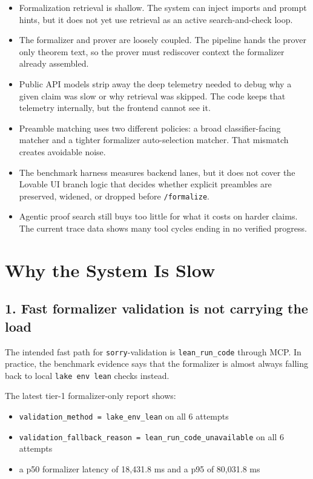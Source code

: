 \documentclass[11pt]{article}
\begin{document}
\begin{itemize}[leftmargin=1.5em]
  \item Formalization retrieval is shallow. The system can inject imports and
  prompt hints, but it does not yet use retrieval as an active search-and-check
  loop.
  \item The formalizer and prover are loosely coupled. The pipeline hands the
  prover only theorem text, so the prover must rediscover context the
  formalizer already assembled.
  \item Public API models strip away the deep telemetry needed to debug why a
  given claim was slow or why retrieval was skipped. The code keeps that
  telemetry internally, but the frontend cannot see it.
  \item Preamble matching uses two different policies: a broad classifier-facing
  matcher and a tighter formalizer auto-selection matcher. That mismatch creates
  avoidable noise.
  \item The benchmark harness measures backend lanes, but it does not cover the
  Lovable UI branch logic that decides whether explicit preambles are preserved,
  widened, or dropped before \texttt{/formalize}.
  \item Agentic proof search still buys too little for what it costs on harder
  claims. The current trace data shows many tool cycles ending in no verified
  progress.
\end{itemize}

\section{Why the System Is Slow}

\subsection*{1. Fast formalizer validation is not carrying the load}

The intended fast path for \texttt{sorry}-validation is
\texttt{lean\_run\_code} through MCP. In practice, the benchmark evidence says
that the formalizer is almost always falling back to local
\texttt{lake env lean} checks instead.

The latest tier-1 formalizer-only report shows:

\begin{itemize}[leftmargin=1.5em]
  \item \texttt{validation\_method = lake\_env\_lean} on all 6 attempts
  \item \texttt{validation\_fallback\_reason = lean\_run\_code\_unavailable} on all 6 attempts
  \item a p50 formalizer latency of 18{,}431.8 ms and a p95 of 80{,}031.8 ms
\end{itemize}
\end{document}
